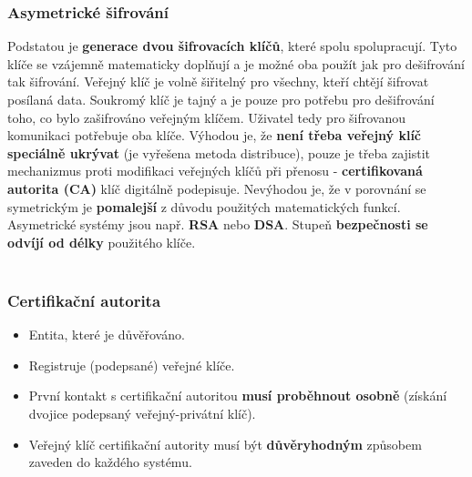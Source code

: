 \subsubsection{Asymetrické šifrování}
Podstatou je \textbf{generace dvou šifrovacích klíčů}, které spolu spolupracují. Tyto klíče se vzájemně matematicky doplňují a je možné oba použít jak pro dešifrování tak šifrování. Veřejný klíč je volně šiřitelný pro všechny, kteří chtějí šifrovat posílaná data. Soukromý klíč je tajný a je pouze pro potřebu pro dešifrování toho, co bylo zašifrováno veřejným klíčem. Uživatel tedy pro šifrovanou komunikaci potřebuje oba klíče. Výhodou je, že\textbf{ není třeba veřejný klíč speciálně ukrývat} (je vyřešena metoda distribuce), pouze je třeba zajistit mechanizmus proti modifikaci veřejných klíčů při přenosu - \textbf{certifikovaná autorita (CA)} klíč digitálně podepisuje. Nevýhodou je, že v porovnání se symetrickým je \textbf{pomalejší} z důvodu použitých matematických funkcí. Asymetrické systémy jsou např. \textbf{RSA} nebo \textbf{DSA}. Stupeň \textbf{bezpečnosti se odvíjí od délky} použitého klíče.
\\\\
\noindent{}


\subsubsection{Certifikační autorita}
\begin{itemize}
	\item Entita, které je důvěřováno.
	\item Registruje (podepsané) veřejné klíče.
	\item První kontakt s certifikační autoritou \textbf{musí proběhnout osobně }(získání dvojice podepsaný veřejný-privátní klíč).
	\item Veřejný klíč certifikační autority musí být \textbf{důvěryhodným} způsobem zaveden do každého systému.
\end{itemize}


